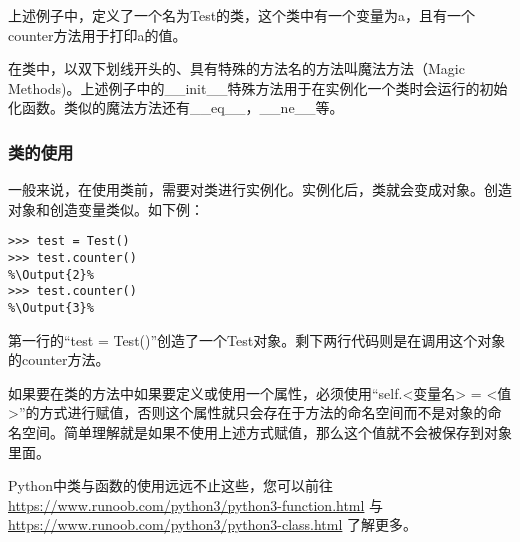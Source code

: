 \documentclass[../../Main.tex]{subfiles}
\begin{document}
上述例子中，定义了一个名为Test的类，这个类中有一个变量为a，且有一个counter方法用于打印a的值。
\begin{ExtraKnowledge}
    在类中，以双下划线开头的、具有特殊的方法名的方法叫魔法方法（Magic Methods)。上述例子中的\_\_init\_\_特殊方法用于在实例化一个类时会运行的初始化函数。类似的魔法方法还有\_\_eq\_\_，\_\_ne\_\_等。
\end{ExtraKnowledge}

\subsubsection{类的使用}
一般来说，在使用类前，需要对类进行实例化。实例化后，类就会变成对象。创造对象和创造变量类似。如下例：

\begin{lstlisting}
>>> test = Test()
>>> test.counter()
%\Output{2}%
>>> test.counter()
%\Output{3}%
\end{lstlisting}

第一行的“test = Test()”创造了一个Test对象。剩下两行代码则是在调用这个对象的counter方法。

如果要在类的方法中如果要定义或使用一个属性，必须使用“self.<变量名> = <值>”的方式进行赋值，否则这个属性就只会存在于方法的命名空间而不是对象的命名空间。简单理解就是如果不使用上述方式赋值，那么这个值就不会被保存到对象里面。

\begin{ExtraKnowledge}
    Python中类与函数的使用远远不止这些，您可以前往 \url{https://www.runoob.com/python3/python3-function.html} 与 \url{https://www.runoob.com/python3/python3-class.html} 了解更多。
\end{ExtraKnowledge}
\end{document}
